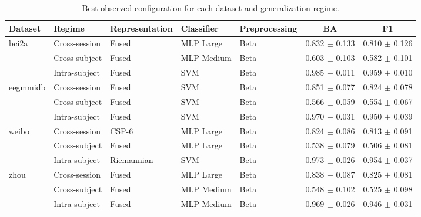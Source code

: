 \begin{table}[t]
\centering
\small
\caption{Best observed configuration for each dataset and generalization regime.}
\label{tab:best_configurations}
\begin{tabular}{lllllcc}
\toprule
\textbf{Dataset} & \textbf{Regime} & \textbf{Representation} &
\textbf{Classifier} & \textbf{Preprocessing} & \textbf{BA} & \textbf{F1} \\
\midrule
bci2a & Cross-session & Fused & MLP Large & Beta & 0.832 $\pm$ 0.133 & 0.810 $\pm$ 0.126 \\
 & Cross-subject & Fused & MLP Medium & Beta & 0.603 $\pm$ 0.103 & 0.582 $\pm$ 0.101 \\
 & Intra-subject & Fused & SVM & Beta & 0.985 $\pm$ 0.011 & 0.959 $\pm$ 0.010 \\
\midrule
eegmmidb & Cross-session & Fused & SVM & Beta & 0.851 $\pm$ 0.077 & 0.824 $\pm$ 0.078 \\
 & Cross-subject & Fused & SVM & Beta & 0.566 $\pm$ 0.059 & 0.554 $\pm$ 0.067 \\
 & Intra-subject & Fused & SVM & Beta & 0.970 $\pm$ 0.031 & 0.950 $\pm$ 0.039 \\
\midrule
weibo & Cross-session & CSP-6 & MLP Large & Beta & 0.824 $\pm$ 0.086 & 0.813 $\pm$ 0.091 \\
 & Cross-subject & Fused & MLP Large & Beta & 0.538 $\pm$ 0.079 & 0.506 $\pm$ 0.081 \\
 & Intra-subject & Riemannian & SVM & Beta & 0.973 $\pm$ 0.026 & 0.954 $\pm$ 0.037 \\
\midrule
zhou & Cross-session & Fused & MLP Large & Beta & 0.838 $\pm$ 0.087 & 0.825 $\pm$ 0.081 \\
 & Cross-subject & Fused & MLP Medium & Beta & 0.548 $\pm$ 0.102 & 0.525 $\pm$ 0.098 \\
 & Intra-subject & Fused & MLP Medium & Beta & 0.969 $\pm$ 0.026 & 0.946 $\pm$ 0.031 \\
\bottomrule
\end{tabular}
\end{table}